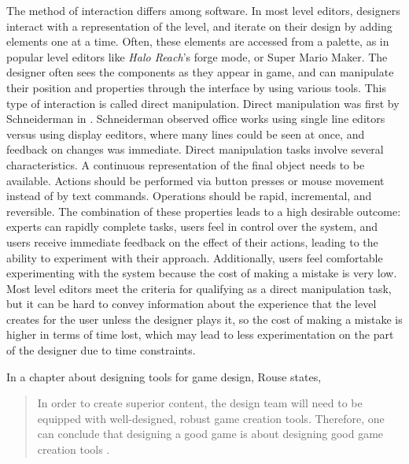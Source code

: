 The method of interaction differs among software. In most level editors, designers interact
with a representation of the level, and iterate on their design by adding elements one at a
time. Often, these elements are accessed from a palette, as in popular level editors like
\emph{Halo Reach}'s forge mode, or Super Mario Maker. The designer often sees the components
as they appear in game, and can manipulate their position and properties through the interface
by using various tools. This type of interaction is called direct manipulation. Direct
manipulation was first by Schneiderman in \cite{schneiderman1983}. Schneiderman observed
office works using single line editors versus using display eeditors, where many lines could
be seen at once, and feedback on changes was immediate. Direct manipulation tasks involve
several characteristics. A continuous representation of the final object needs to be
available. Actions should be performed via button presses or mouse movement instead of by
text commands. Operations should be rapid, incremental, and reversible. The combination
of these properties leads to a high desirable outcome: experts can rapidly complete tasks,
users feel in control over the system, and users receive immediate feedback on the effect of
their actions, leading to the ability to experiment with their approach. Additionally, users
feel comfortable experimenting with the system because the cost of making a mistake is very
low. Most level editors meet the criteria for qualifying as a direct manipulation task, but it
can be hard to convey information about the experience that the level creates for the user
unless the designer plays it, so the cost of making a mistake is higher in terms of time lost,
which may lead to less experimentation on the part of the designer due to time constraints.

In a chapter about designing tools for game design, Rouse states,
\begin{quote}
In order to create superior content, the design team will need to be equipped with 
well-designed, robust game creation tools. Therefore, one can conclude that designing a
good game is about designing good game creation tools \cite[p392]{rouse2004}.
\end{quote}

